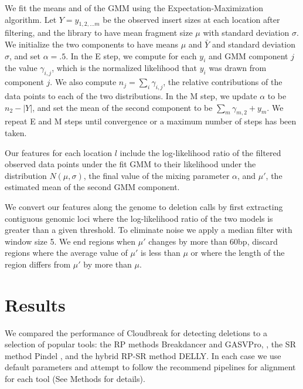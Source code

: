 \documentclass[11pt]{article}
\begin{document}
\begin{description}
We fit the means and of the GMM using the Expectation-Maximization algorithm. Let $Y = y_{1,2, \ldots m}$ be the observed insert sizes at each location after filtering, and the library to have mean fragment size $\mu$ with standard deviation $\sigma$. We initialize the two components to have means $\mu$ and $\bar{Y}$ and standard deviation $\sigma$, and set $\alpha = .5$. In the E step, we compute for each $y_i$ and GMM component $j$ the value $\gamma_{i,j}$, which is the normalized likelihood that $y_i$ was drawn from component $j$. We also compute $n_j = \sum_i{\gamma_{i,j}}$, the relative contributions of the data points to each of the two distributions. In the M step, we update $\alpha$ to be $n_2 - \left|Y\right|$, and set the mean of the second component to be $\sum_m{\gamma_{m,2} + y_m}$. We repeat E and M steps until convergence or a maximum number of steps has been taken.

Our features for each location $l$ include the log-likelihood ratio of the filtered observed data points under the fit GMM to their likelihood under the distribution $N(\mu,\sigma)$, the final value of the mixing parameter $\alpha$, and $\mu'$, the estimated mean of the second GMM component.

\item[\sc{PostProcess}] We convert our features along the genome to deletion calls by first extracting contiguous genomic loci where the log-likelihood ratio of the two models is greater than a given threshold. To eliminate noise we apply a median filter with window size 5. We end regions when $\mu'$ changes by more than 60bp, discard regions where the average value of $\mu'$ is less than $\mu$ or where the length of the region differs from $\mu'$ by more than $\mu$.
\end{description}


\section{Results}\label{results}

We compared the performance of Cloudbreak for detecting deletions to a selection of popular tools: the RP methods Breakdancer \autocite{Chen:2009p3} and GASVPro, \autocite{Sindi:2012kk}, the SR method Pindel \autocite{Ye:2009p2}, and the hybrid RP-SR method DELLY. \autocite{Rausch:2012he} In each case we use default parameters and attempt to follow the recommend pipelines for alignment for each tool (See Methods for details).
\end{document}
